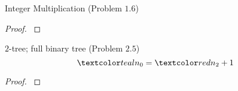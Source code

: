 \begin{frame}{}
  \begin{exampleblock}{Integer Multiplication (Problem $1.6$)}
    
  \end{exampleblock}
  
  \pause
  \begin{proof}
    \centerline{}
  \end{proof}
\end{frame}

\begin{frame}{}
  \begin{exampleblock}{$2$-tree; full binary tree (Problem $2.5$)}
    \[
      \teal{n_0} = \red{n_2} + 1
    \]
  \end{exampleblock}

  \vspace{0.30cm}
  \begin{proof}
    \pause
    \centerline{}
  \end{proof}
\end{frame}
